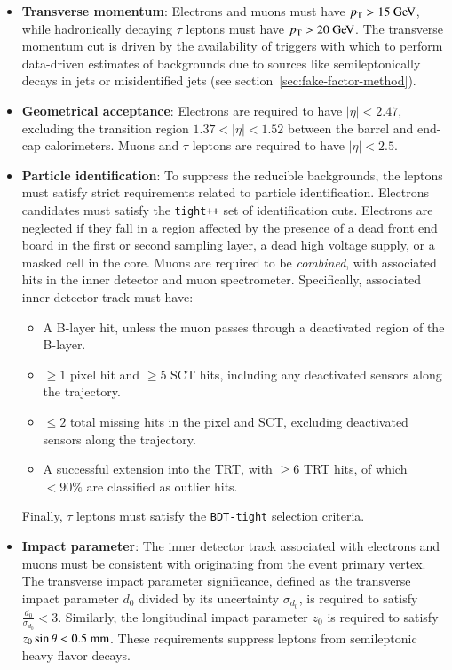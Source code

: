 \begin{itemize}

	\item \textbf{Transverse momentum}: Electrons and muons must have $\pt>15 \GeV$, while hadronically decaying $\tau$ leptons must have $\pt>20 \GeV$. The transverse momentum cut is driven by the availability of triggers with which to perform data-driven estimates of backgrounds due to sources like semileptonically decays in jets or misidentified jets (see section~\ref{sec:fake-factor-method}). 

	\item \textbf{Geometrical acceptance}: Electrons are required to have $|\eta|<2.47$, excluding the transition region $1.37<|\eta|<1.52$ between the barrel and end-cap calorimeters. Muons and $\tau$ leptons are required to have $|\eta|<2.5$.

	\item \textbf{Particle identification}: To suppress the reducible backgrounds, the leptons must satisfy strict requirements related to particle identification. Electrons candidates must satisfy the \texttt{tight++} set of identification cuts. Electrons are neglected if they fall in a region affected by the presence of a dead front end board in the first or second sampling layer, a dead high voltage supply, or a masked cell in the core. Muons are required to be \emph{combined}, with associated hits in the inner detector and muon spectrometer. Specifically, associated inner detector track must have:
	\begin{itemize}
	  \item A B-layer hit, unless the muon passes through a deactivated region of the B-layer.
	  \item $\geq1$ pixel hit and $\geq5$ SCT hits, including any deactivated sensors along the trajectory.
	  \item $\leq2$ total missing hits in the pixel and SCT, excluding deactivated sensors along the trajectory. 
	  \item A successful extension into the TRT, with $\geq6$ TRT hits, of which $<90\%$ are classified as outlier hits.
	\end{itemize}

	Finally, $\tau$ leptons must satisfy the \texttt{BDT-tight} selection criteria.

	\item \textbf{Impact parameter}: The inner detector track associated with electrons and muons must be consistent with originating from the event primary vertex. The transverse impact parameter significance, defined as the transverse impact parameter $d_0$ divided by its uncertainty $\sigma_{d_0}$, is required to satisfy $\frac{d_0}{\sigma_{d_0}}<3$. Similarly, the longitudinal impact parameter $z_0$ is required to satisfy $z_0\sin\theta < 0.5~\mathrm{mm}$. These requirements suppress leptons from semileptonic heavy flavor decays. 


\end{itemize}
